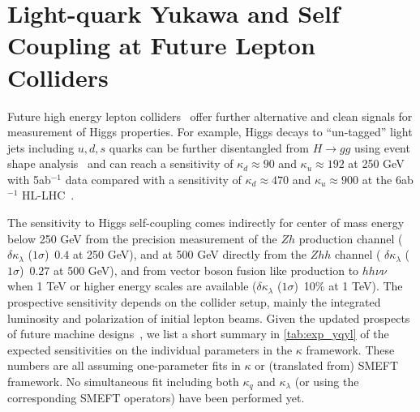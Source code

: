 \section{Light-quark Yukawa and Self Coupling at Future Lepton Colliders}
\label{sec:Lep}
Future high energy lepton colliders~\cite{Charles:2018vfv,Bambade:2019fyw,CEPCStudyGroup:2018ghi} offer further alternative and clean signals for measurement of Higgs properties. 
For example, Higgs decays to ``un-tagged'' light jets including $u,d,s$ quarks can be further disentangled from $H\to gg$ using event shape analysis~\cite{Gao:2016jcm} and can reach a sensitivity of $\kappa_d \approx 90$ and $\kappa_u \approx192$ at 250 GeV with 5ab$^{-1}$ data compared with a sensitivity of $\kappa_d \approx 470$ and $\kappa_u \approx900$ at the 6ab$^{-1}$ HL-LHC~\cite{Carpenter:2016mwd,Soreq:2016rae}.

The sensitivity to Higgs self-coupling comes indirectly for center of mass energy below 250 GeV from the precision measurement of the $Zh$ production channel ($\delta \kappa_\lambda$  ($1\sigma$)~$0.4$ at 250 GeV), and at 500 GeV directly from the $Zhh$ channel ( $\delta \kappa_\lambda$  ($1\sigma$)~$0.27$ at 500 GeV), and from vector boson fusion like production to $hh\nu\nu$ when 1 TeV or higher energy scales are available ($\delta \kappa_\lambda$  ($1\sigma$)~10\% at 1 TeV). The prospective sensitivity depends on the collider setup, mainly the integrated luminosity and polarization of initial lepton beams. Given the updated prospects of future machine designs~\cite{deBlas:2019rxi}, 
we list a short summary in \autoref{tab:exp_yqyl} of the expected sensitivities on the individual parameters in the $\kappa$ framework. These numbers are all assuming one-parameter fits in $\kappa$ or (translated from) SMEFT framework. No simultaneous fit including both $\kappa_q$ and $\kappa_\lambda$ (or using the corresponding SMEFT operators) have been performed yet. 


